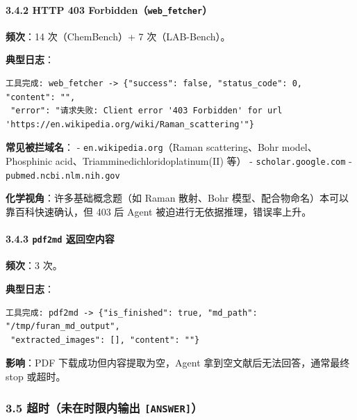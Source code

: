 \documentclass[
]{achemso}
\begin{document}
\hypertarget{http-403-forbiddenweb_fetcher}{%
\paragraph{\texorpdfstring{3.4.2 HTTP 403
Forbidden（\texttt{web\_fetcher}）}{3.4.2 HTTP 403 Forbidden（web\_fetcher）}}\label{http-403-forbiddenweb_fetcher}}

\textbf{频次}：14 次（ChemBench）+ 7 次（LAB-Bench）。

\textbf{典型日志}：

\begin{verbatim}
工具完成: web_fetcher -> {"success": false, "status_code": 0, "content": "",
 "error": "请求失败: Client error '403 Forbidden' for url 'https://en.wikipedia.org/wiki/Raman_scattering'"}
\end{verbatim}

\textbf{常见被拦域名}： - \texttt{en.wikipedia.org}（Raman
scattering、Bohr model、Phosphinic acid、Triamminedichloridoplatinum(II)
等） - \texttt{scholar.google.com} - \texttt{pubmed.ncbi.nlm.nih.gov}

\textbf{化学视角}：许多基础概念题（如 Raman 散射、Bohr
模型、配合物命名）本可以靠百科快速确认，但 403 后 Agent
被迫进行无依据推理，错误率上升。

\hypertarget{pdf2md-ux8fd4ux56deux7a7aux5185ux5bb9}{%
\paragraph{\texorpdfstring{3.4.3 \texttt{pdf2md}
返回空内容}{3.4.3 pdf2md 返回空内容}}\label{pdf2md-ux8fd4ux56deux7a7aux5185ux5bb9}}

\textbf{频次}：3 次。

\textbf{典型日志}：

\begin{verbatim}
工具完成: pdf2md -> {"is_finished": true, "md_path": "/tmp/furan_md_output",
 "extracted_images": [], "content": ""}
\end{verbatim}

\textbf{影响}：PDF 下载成功但内容提取为空，Agent
拿到空文献后无法回答，通常最终 stop 或超时。

\hypertarget{ux8d85ux65f6ux672aux5728ux65f6ux9650ux5185ux8f93ux51fa-answer}{%
\subsubsection{\texorpdfstring{3.5 超时（未在时限内输出
\texttt{{[}ANSWER{]}}）}{3.5 超时（未在时限内输出 {[}ANSWER{]}）}}\label{ux8d85ux65f6ux672aux5728ux65f6ux9650ux5185ux8f93ux51fa-answer}}
\end{document}
